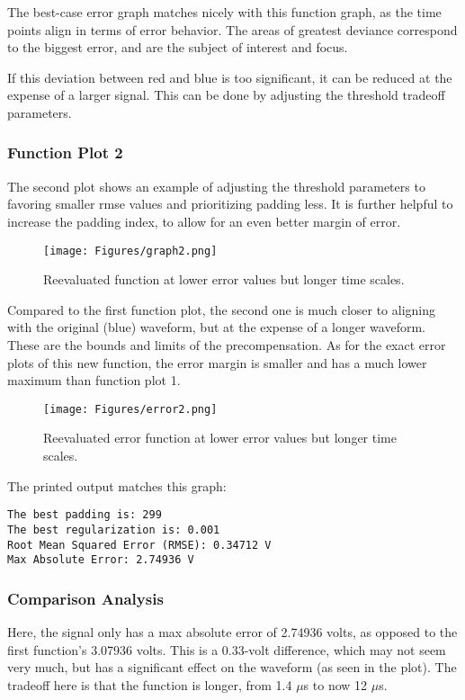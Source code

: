 The best-case error graph matches nicely with this function graph, as the time points align in terms of error behavior. The areas of greatest deviance correspond to the biggest error, and are the subject of interest and focus.

If this deviation between red and blue is too significant, it can be reduced at the expense of a larger signal. This can be done by adjusting the threshold tradeoff parameters.
\newpage
\subsubsection{Function Plot 2}
The second plot shows an example of adjusting the threshold parameters to favoring smaller rmse values and prioritizing padding less. It is further helpful to increase the padding index, to allow for an even better margin of error.

\begin{figure}[h!]
    \centering
\texttt{[image: Figures/graph2.png]}
    \caption{Reevaluated function at lower error values but longer time scales.}
\end{figure} \label{graph2}

Compared to the first function plot, the second one is much closer to aligning with the original (blue) waveform, but at the expense of a longer waveform. These are the bounds and limits of the precompensation.
\newpage
As for the exact error plots of this new function, the error margin is smaller and has a much lower maximum than function plot 1.

\begin{figure}[h!]
    \centering
\texttt{[image: Figures/error2.png]}
    \caption{Reevaluated error function at lower error values but longer time scales.}
\end{figure} \label{error2}

The printed output matches this graph:

\begin{verbatim}
The best padding is: 299
The best regularization is: 0.001
Root Mean Squared Error (RMSE): 0.34712 V
Max Absolute Error: 2.74936 V
\end{verbatim}

\subsubsection{Comparison Analysis}
Here, the signal only has a max absolute error of 2.74936 volts, as opposed to the first function's 3.07936 volts. This is a 0.33-volt difference, which may not seem very much, but has a significant effect on the waveform (as seen in the plot). The tradeoff here is that the function is longer, from 1.4 $\mu$s to now 12 $\mu$s.
